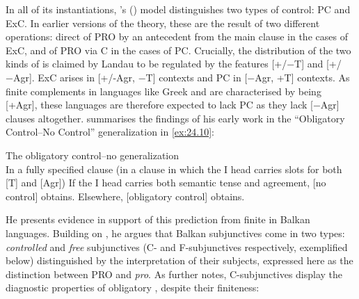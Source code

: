 \documentclass[output=paper]{langsci/langscibook}
\begin{document}
In all of its instantiations, \citeauthor{Landau2000}'s
(\citeyear{Landau2000,Landau2004,Landau2015}) model distinguishes two types of
control: \gls{PC} and
\gls{ExC}. In earlier versions of the theory,
these are the result of two different operations: direct  of PRO by an
antecedent from the main clause in the cases of \gls{ExC}, and  of PRO via C in the cases of PC. Crucially, the
distribution of the two kinds of  is claimed by Landau to be regulated
by the features [+/−T] and [+/−Agr]. \gls{ExC}
arises in [+/-Agr, −T] contexts and \gls{PC} in
[−Agr, +T] contexts. As finite complements in languages like Greek and 
are characterised by being [+Agr], these languages are therefore expected to
lack \gls{PC} as they lack [−Agr] clauses
altogether.  \citet[7]{Landau2015} summarises the findings of his early work in
the “Obligatory Control--No Control” generalization in \eqref{ex:24.10}:

\ea\label{ex:24.10} The obligatory control--no  generalization\\
In a fully specified clause (in a clause in which the I head carries slots for both [T] and [Agr])
	\ea If the I head carries both semantic tense and agreement, [no control] obtains.
	\ex Elsewhere, [obligatory control] obtains.
	\z
\z

He presents evidence in support of this prediction from finite  in
Balkan languages. Building on \citet{Varlokosta1994}, he argues that Balkan
subjunctives come in two types: \emph{controlled} and \emph{free} subjunctives
(C- and F-subjunctives respectively, exemplified below) distinguished by the
interpretation of their subjects, expressed here as the distinction between PRO
and \emph{pro}. As \citet[827]{Landau2004} further notes, C-subjunctives
display the diagnostic properties of obligatory , despite their
finiteness:
\end{document}
